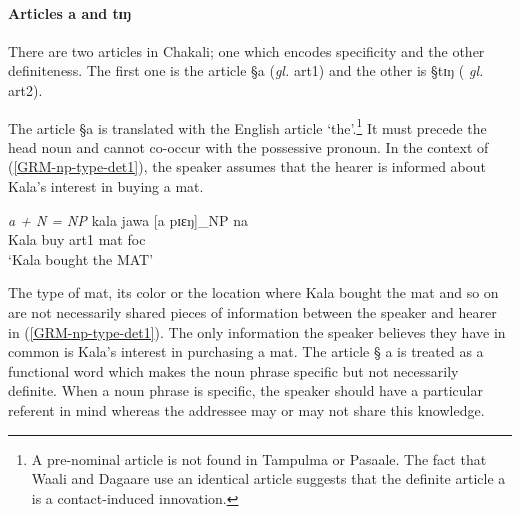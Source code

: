 
\begin{exe}
\ex\label{ex:GRM-poss-def-tree}
\end{exe}





\paragraph{Articles a and tɪŋ}
\label{sec:GRM-np-def-articles}

There are two articles in Chakali; one which encodes specificity and the other
definiteness. The first one is the 
article {\S a} ({\it gl.} {\sc art1}) and the other is  {\S tɪŋ}  ({\it
gl.} {\sc art2}).  

The  article {\S a} is translated with the English article
`the'.\footnote{A pre-nominal article is not found in Tampulma or Pasaale. The
fact that
Waali and Dagaare use an identical  article suggests that the definite article
{\F a}
is a contact-induced innovation.} It must precede the head noun and cannot
co-occur with the possessive pronoun.  In the context of
(\ref{GRM-np-type-det1}), the speaker assumes that the hearer is informed about
Kala's interest in buying a mat. 


\begin{exe}
 \ex\label{GRM-np-type-det1}{\it  a + N = NP}
\gll  kala jawa  [a pɪɛŋ]_{NP} na\\
     Kala buy {\sc art1}  mat {\sc foc}\\
\glt  `Kala bought the MAT' 
\end{exe}


The type of mat,  its color or the location where Kala bought the mat and so on
are not necessarily shared pieces of information between the speaker and hearer
in (\ref{GRM-np-type-det1}).  The only information the speaker believes they
have in common is Kala's interest in purchasing a mat. The article {\S
a} is treated as a functional word which makes the noun phrase specific but not
necessarily
definite.  When a noun phrase is  specific, the speaker should have a particular
referent in mind whereas the addressee may or may not share this knowledge.


